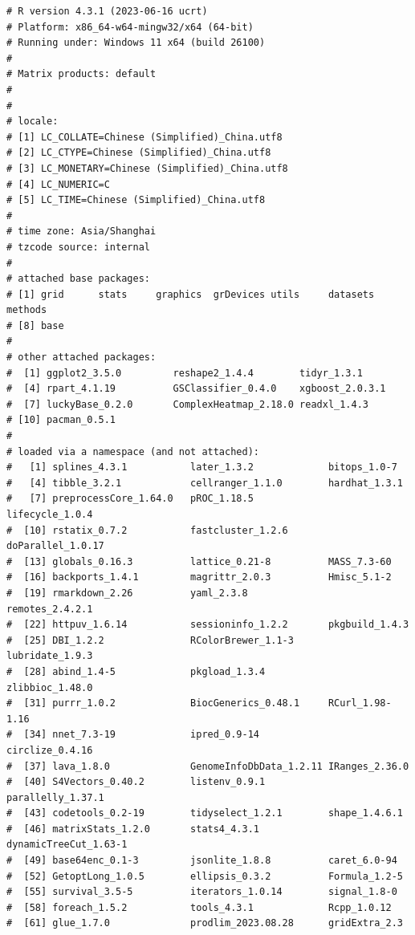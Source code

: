 \documentclass[
  12pt,
]{book}
\begin{document}
\begin{lstlisting}
# R version 4.3.1 (2023-06-16 ucrt)
# Platform: x86_64-w64-mingw32/x64 (64-bit)
# Running under: Windows 11 x64 (build 26100)
# 
# Matrix products: default
# 
# 
# locale:
# [1] LC_COLLATE=Chinese (Simplified)_China.utf8 
# [2] LC_CTYPE=Chinese (Simplified)_China.utf8   
# [3] LC_MONETARY=Chinese (Simplified)_China.utf8
# [4] LC_NUMERIC=C                               
# [5] LC_TIME=Chinese (Simplified)_China.utf8    
# 
# time zone: Asia/Shanghai
# tzcode source: internal
# 
# attached base packages:
# [1] grid      stats     graphics  grDevices utils     datasets  methods  
# [8] base     
# 
# other attached packages:
#  [1] ggplot2_3.5.0         reshape2_1.4.4        tidyr_1.3.1          
#  [4] rpart_4.1.19          GSClassifier_0.4.0    xgboost_2.0.3.1      
#  [7] luckyBase_0.2.0       ComplexHeatmap_2.18.0 readxl_1.4.3         
# [10] pacman_0.5.1         
# 
# loaded via a namespace (and not attached):
#   [1] splines_4.3.1           later_1.3.2             bitops_1.0-7           
#   [4] tibble_3.2.1            cellranger_1.1.0        hardhat_1.3.1          
#   [7] preprocessCore_1.64.0   pROC_1.18.5             lifecycle_1.0.4        
#  [10] rstatix_0.7.2           fastcluster_1.2.6       doParallel_1.0.17      
#  [13] globals_0.16.3          lattice_0.21-8          MASS_7.3-60            
#  [16] backports_1.4.1         magrittr_2.0.3          Hmisc_5.1-2            
#  [19] rmarkdown_2.26          yaml_2.3.8              remotes_2.4.2.1        
#  [22] httpuv_1.6.14           sessioninfo_1.2.2       pkgbuild_1.4.3         
#  [25] DBI_1.2.2               RColorBrewer_1.1-3      lubridate_1.9.3        
#  [28] abind_1.4-5             pkgload_1.3.4           zlibbioc_1.48.0        
#  [31] purrr_1.0.2             BiocGenerics_0.48.1     RCurl_1.98-1.16        
#  [34] nnet_7.3-19             ipred_0.9-14            circlize_0.4.16        
#  [37] lava_1.8.0              GenomeInfoDbData_1.2.11 IRanges_2.36.0         
#  [40] S4Vectors_0.40.2        listenv_0.9.1           parallelly_1.37.1      
#  [43] codetools_0.2-19        tidyselect_1.2.1        shape_1.4.6.1          
#  [46] matrixStats_1.2.0       stats4_4.3.1            dynamicTreeCut_1.63-1  
#  [49] base64enc_0.1-3         jsonlite_1.8.8          caret_6.0-94           
#  [52] GetoptLong_1.0.5        ellipsis_0.3.2          Formula_1.2-5          
#  [55] survival_3.5-5          iterators_1.0.14        signal_1.8-0           
#  [58] foreach_1.5.2           tools_4.3.1             Rcpp_1.0.12            
#  [61] glue_1.7.0              prodlim_2023.08.28      gridExtra_2.3          

\end{lstlisting}
\end{document}
